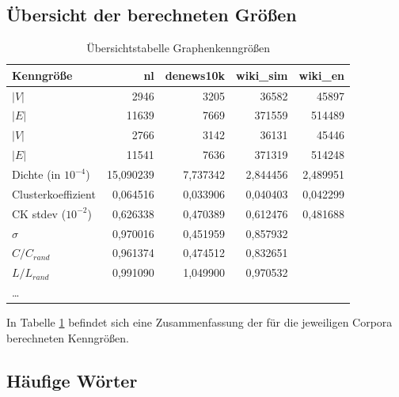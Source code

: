 \documentclass[11pt, a4paper]{article}
\begin{document}

\subsection{Übersicht der berechneten Größen}
\begin{table}[ht]
    \begin{tabular}{l*{4}{r}}
    \toprule
    Kenngröße                     & nl        & denews10k & wiki\_sim & wiki\_en \\
    \midrule
    $|V|$                         & 2946      & 3205      & 36582     & 45897  \\
    $|E|$                         & 11639     & 7669      & 371559    & 514489 \\
    $|V|$\footnotemark[6]         & 2766      & 3142      & 36131     & 45446  \\
    $|E|$\footnotemark[6]         & 11541     & 7636      & 371319    & 514248 \\
    Dichte (in $10^{-4}$)          & 15,090239 & 7,737342  & 2,844456  & 2,489951 \\
    Clusterkoeffizient            & 0,064516  & 0,033906  & 0,040403  & 0,042299 \\
    CK stdev ($10^{-2}$)           & 0,626338  & 0,470389  & 0,612476  & 0,481688 \\
    $\sigma$                      & 0,970016  & 0,451959  & 0,857932  &         \\
    $C / C_{rand}$                 & 0,961374  & 0,474512  & 0,832651  &         \\
    $L / L_{rand}$                 & 0,991090  & 1,049900  & 0,970532  &         \\
    \dots                         &           &           &           &          \\
    \bottomrule
    \end{tabular}
    \caption{Übersichtstabelle Graphenkenngrößen}
    \label{tab-zsf}
\end{table}

In Tabelle \ref{tab-zsf} befindet sich eine Zusammenfassung der für die
jeweiligen Corpora berechneten Kenngrößen.


\subsection{H\"aufige W\"orter}
\end{document}
